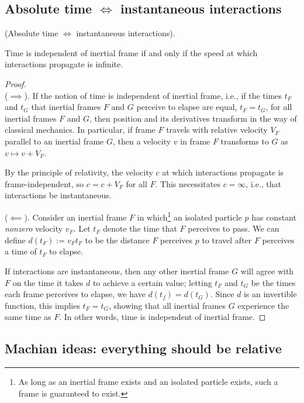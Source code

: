 \documentclass{article}
\begin{document}
\subsection*{Absolute time $\iff$ instantaneous interactions}

\begin{theorem}
    \label{thm_absolute_time_instantaneous_interactions}
    (Absolute time $\iff$ instantaneous interactions).

    Time is independent of inertial frame if and only if the speed at which interactions propagate is infinite. 
\end{theorem}

\begin{proof}
    \mbox{} \\ \indent
    ($\implies$). If the notion of time is independent of inertial frame, i.e., if the times $t_F$ and $t_G$ that inertial frames $F$ and $G$ perceive to elapse are equal, $t_F = t_G$, for all inertial frames $F$ and $G$, then position and its derivatives transform in the way of classical mechanics. In particular, if frame $F$ travels with relative velocity $V_F$ parallel to an inertial frame $G$, then a velocity $v$ in frame $F$ transforms to $G$ as $v \mapsto v + V_F$.

    By the principle of relativity, the velocity $c$ at which interactions propagate is frame-independent, so $c = c + V_F$ for all $F$. This necessitates $c = \infty$, i.e., that interactions be instantaneous.
    
    ($\impliedby$). Consider an inertial frame $F$ in which\footnote{As long as an inertial frame exists and an isolated particle exists, such a frame is guaranteed to exist.} an isolated particle $p$ has constant \textit{nonzero} velocity $v_F$. Let $t_F$ denote the time that $F$ perceives to pass. We can define $d(t_F) := v_F t_F$ to be the distance $F$ perceives $p$ to travel after $F$ perceives a time of $t_F$ to elapse.

    If interactions are instantaneous, then any other inertial frame $G$ will agree with $F$ on the time it takes $d$ to achieve a certain value; letting $t_F$ and $t_G$ be the times each frame perceives to elapse, we have $d(t_f) = d(t_G)$. Since $d$ is an invertible function, this implies $t_F = t_G$, showing that all inertial frames $G$ experience the same time as $F$. In other words, time is independent of inertial frame.
\end{proof}

\subsection*{Machian ideas: everything should be relative}
\end{document}
